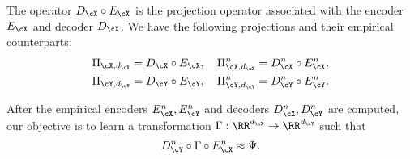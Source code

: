 \documentclass[11pt]{article} %
\newcommand{\ReLU}{\mathrm{ReLU}}
\begin{document}
The operator $D_{\cX}\circ E_{\cX}$ is  the projection operator associated with the encoder $E_{\cX}$ and decoder $D_{\cX}$.
We have the following projections and their empirical counterparts:
\begin{align*}
	&\Pi_{\cX,d_{\cX}}=D_{\cX}\circ E_{\cX},\quad \Pi_{\cX,d_{\cX}}^n=D_{\cX}^n\circ E_{\cX}^n,\\
	&\Pi_{\cY,d_{\cY}}=D_{\cY}\circ E_{\cY},\quad \Pi_{\cY,d_{\cY}}^n=D_{\cY}^n\circ E_{\cY}^n.
\end{align*}



After the empirical encoders $E_{\cX}^n,E_{\cY}^n$ and decoders $D_{\cX}^n,D_{\cY}^n$ are computed, our objective is to learn a transformation $\Gamma: \RR^{d_{\cX}}\rightarrow \RR^{d_{\cY}}$ such that
\begin{align}
	D_{\cY}^n \circ \Gamma \circ E_{\cX}^n \approx \Psi.
	\label{eq.Gamma}
\end{align}
\end{document}
